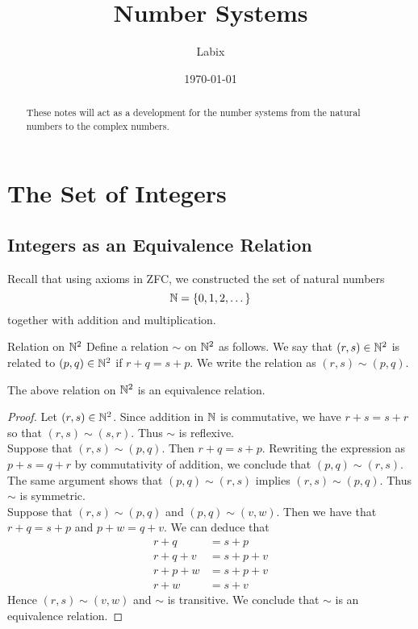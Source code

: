 \documentclass[a4paper]{article}
\title{Number Systems}
\author{Labix}
\date{\today}
\begin{document}
\maketitle
\begin{abstract}
These notes will act as a development for the number systems from the natural numbers to the complex numbers. 
\end{abstract}
\pagebreak
\tableofcontents

\pagebreak
\section{The Set of Integers}
\subsection{Integers as an Equivalence Relation}
Recall that using axioms in ZFC, we constructed the set of natural numbers $$\mathbb{N}=\{0,1,2,\dots\}$$ together with addition and multiplication. 

\begin{defn}{Relation on $\mathbb{N}^2$}{} Define a relation $\sim$ on $\mathbb{N}^2$ as follows. We say that $(r,s)\in\mathbb{N}^2$ is related to $(p,q)\in\mathbb{N}^2$ if $r+q=s+p$. We write the relation as $(r,s)\sim(p,q)$. 
\end{defn}

\begin{lmm}{}{} The above relation on $\mathbb{N}^2$ is an equivalence relation. 
\begin{proof}
Let $(r,s)\in\mathbb{N}^2$. Since addition in $\mathbb{N}$ is commutative, we have $r+s=s+r$ so that $(r,s)\sim(s,r)$. Thus $\sim$ is reflexive. \\

Suppose that $(r,s)\sim(p,q)$. Then $r+q=s+p$. Rewriting the expression as $p+s=q+r$ by commutativity of addition, we conclude that $(p,q)\sim(r,s)$. The same argument shows that $(p,q)\sim(r,s)$ implies $(r,s)\sim(p,q)$. Thus $\sim$ is symmetric. \\

Suppose that $(r,s)\sim(p,q)$ and $(p,q)\sim(v,w)$. Then we have that $r+q=s+p$ and $p+w=q+v$. We can deduce that 
\begin{align*}
r+q&=s+p\\
r+q+v&=s+p+v\\
r+p+w&=s+p+v\\
r+w&=s+v
\end{align*}
Hence $(r,s)\sim(v,w)$ and $\sim$ is transitive. We conclude that $\sim$ is an equivalence relation. 
\end{proof}
\end{lmm}
\end{document}
